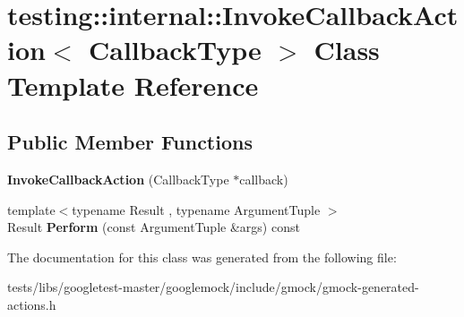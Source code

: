 \hypertarget{classtesting_1_1internal_1_1InvokeCallbackAction}{}\section{testing\+:\+:internal\+:\+:Invoke\+Callback\+Action$<$ Callback\+Type $>$ Class Template Reference}
\label{classtesting_1_1internal_1_1InvokeCallbackAction}
\subsection*{Public Member Functions}
\begin{DoxyCompactItemize}
\item 
\mbox{\label{classtesting_1_1internal_1_1InvokeCallbackAction_a21b051db0b2e1d33fd8d5cdfe7e6824b}} 
{\bfseries Invoke\+Callback\+Action} (Callback\+Type $\ast$callback)
\item 
\mbox{\label{classtesting_1_1internal_1_1InvokeCallbackAction_a74278acbfc51fe7407fdabc9d6a42c70}} 
{\footnotesize template$<$typename Result , typename Argument\+Tuple $>$ }\\Result {\bfseries Perform} (const Argument\+Tuple \&args) const
\end{DoxyCompactItemize}


The documentation for this class was generated from the following file\+:\begin{DoxyCompactItemize}
\item 
tests/libs/googletest-\/master/googlemock/include/gmock/gmock-\/generated-\/actions.\+h\end{DoxyCompactItemize}
